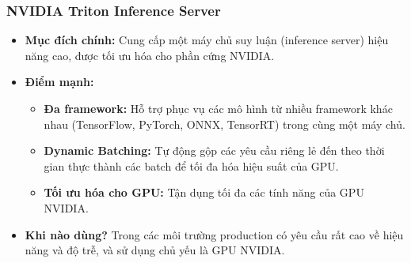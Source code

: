 \subsubsection{NVIDIA Triton Inference Server}
\begin{itemize}
    \item \textbf{Mục đích chính:} Cung cấp một máy chủ suy luận (inference server) hiệu năng cao, được tối ưu hóa cho phần cứng NVIDIA.
    \item \textbf{Điểm mạnh:}
        \begin{itemize}
            \item \textbf{Đa framework:} Hỗ trợ phục vụ các mô hình từ nhiều framework khác nhau (TensorFlow, PyTorch, ONNX, TensorRT) trong cùng một máy chủ.
            \item \textbf{Dynamic Batching:} Tự động gộp các yêu cầu riêng lẻ đến theo thời gian thực thành các batch để tối đa hóa hiệu suất của GPU.
            \item \textbf{Tối ưu hóa cho GPU:} Tận dụng tối đa các tính năng của GPU NVIDIA.
        \end{itemize}
    \item \textbf{Khi nào dùng?} Trong các môi trường production có yêu cầu rất cao về hiệu năng và độ trễ, và sử dụng chủ yếu là GPU NVIDIA.
\end{itemize}